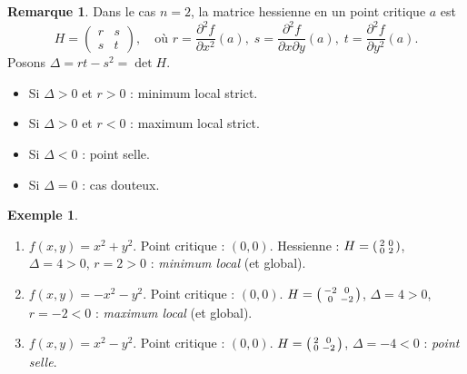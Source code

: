 \documentclass[12pt,a4paper,openany]{book}
\theoremstyle{definition}
\newtheorem{remarque}{Remarque}[chapter]
\newtheorem{exemple}{Exemple}[chapter]
\begin{document}
\begin{remarque}
  \label{rem:critere-dim2}
  Dans le cas $n = 2$, la matrice hessienne en un point critique $a$ est
  \[
    H = \begin{pmatrix}
      r & s \\ s & t
    \end{pmatrix},
    \quad \text{où } r = \frac{\partial^2 f}{\partial x^2}(a),\;
    s = \frac{\partial^2 f}{\partial x \partial y}(a),\;
    t = \frac{\partial^2 f}{\partial y^2}(a).
  \]
  Posons $\Delta = rt - s^2 = \det H$.
  \begin{itemize}
    \item Si $\Delta > 0$ et $r > 0$ : minimum local strict.
    \item Si $\Delta > 0$ et $r < 0$ : maximum local strict.
    \item Si $\Delta < 0$ : point selle.
    \item Si $\Delta = 0$ : cas douteux.
  \end{itemize}
\end{remarque}

\begin{exemple}
  \label{ex:extrema}
  \begin{enumerate}[label=(\alph*)]
    \item $f(x,y) = x^2 + y^2$. Point critique : $(0,0)$. Hessienne : $H = \begin{psmallmatrix} 2 & 0 \\ 0 & 2 \end{psmallmatrix}$, $\Delta = 4 > 0$, $r = 2 > 0$ : \emph{minimum local} (et global).

    \item $f(x,y) = -x^2 - y^2$. Point critique : $(0,0)$. $H = \begin{psmallmatrix} -2 & 0 \\ 0 & -2 \end{psmallmatrix}$, $\Delta = 4 > 0$, $r = -2 < 0$ : \emph{maximum local} (et global).

    \item $f(x,y) = x^2 - y^2$. Point critique : $(0,0)$. $H = \begin{psmallmatrix} 2 & 0 \\ 0 & -2 \end{psmallmatrix}$, $\Delta = -4 < 0$ : \emph{point selle}.
  \end{enumerate}
\end{exemple}
\end{document}
